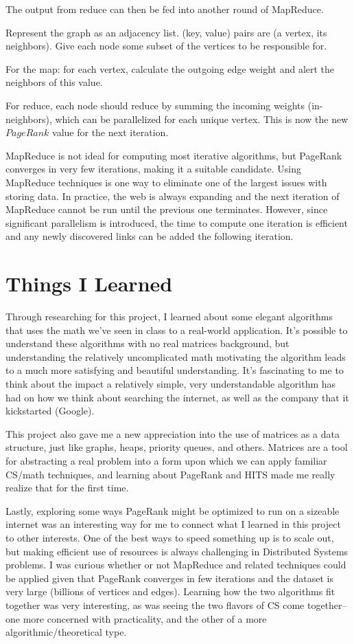 \documentclass{article}
\begin{document}
The output from reduce can then be fed into another round of MapReduce. 

Represent the graph as an adjacency list. (key, value) pairs are (a vertex, its neighbors). Give each node some subset of the vertices to be responsible for.

For the map: for each vertex, calculate the outgoing edge weight and alert the neighbors of this value.

For reduce, each node should reduce by summing the incoming weights (in-neighbors), which can be parallelized for each unique vertex. This is now the new $PageRank$ value for the next iteration.

\medskip
MapReduce is not ideal for computing most iterative algorithms, but PageRank converges in very few iterations, making it a suitable candidate. Using MapReduce techniques is one way to eliminate one of the largest issues with storing data. In practice, the web is always expanding and the next iteration of MapReduce cannot be run until the previous one terminates. However, since significant parallelism is introduced, the time to compute one iteration is efficient and any newly discovered links can be added the following iteration.

\section{Things I Learned}

Through researching for this project, I learned about some elegant algorithms that uses the math we've seen in class to a real-world application. It's possible to understand these algorithms with no real matrices background, but understanding the relatively uncomplicated math motivating the algorithm leads to a much more satisfying and beautiful understanding. It's fascinating to me to think about the impact a relatively simple, very understandable algorithm has had on how we think about searching the internet, as well as the company that it kickstarted (Google).

This project also gave me a new appreciation into the use of matrices as a data structure, just like graphs, heaps, priority queues, and others. Matrices are a tool for abstracting a real problem into a form upon which we can apply familiar CS/math techniques, and learning about PageRank and HITS made me really realize that for the first time.

Lastly, exploring some ways PageRank might be optimized to run on a sizeable internet was an interesting way for me to connect what I learned in this project to other interests. One of the best ways to speed something up is to scale out, but making efficient use of resources is always challenging in Distributed Systems problems. I was curious whether or not MapReduce and related techniques could be applied given that PageRank converges in few iterations and the dataset is very large (billions of vertices and edges). Learning how the two algorithms fit together was very interesting, as was seeing the two flavors of CS come together-- one more concerned with practicality, and the other of a more algorithmic/theoretical type.
\end{document}
